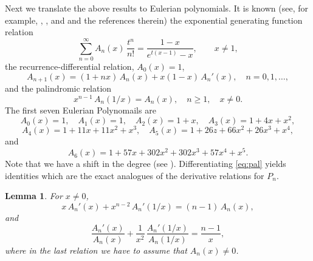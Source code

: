 \documentclass[11pt]{article}
\newtheorem{lemma}{Lemma}
\begin{document}
Next we translate the above results to Eulerian polynomials. It is known (see, for example, \cite[p. 51]{Com}, \cite{Foa}, \cite{Lus} and \cite{Qi} and the references therein) the exponential generating function relation
  \begin{equation}\label{eq:eulerianGF}
  \sum_{n=0}^{\infty} A_n(x)\,\frac{t^n}{n!} = \frac{1-x}{e^{t(x-1)}-x},\qquad x\ne 1,
  \end{equation}
the recurrence-differential relation, $A_0(x)=1$,
\[
  A_{n+1}(x) = (1+n x)\,A_n(x) + x(1-x)\,A_n'(x),\quad n=0,1,\ldots,
\]
and the palindromic relation
\begin{equation}\label{eq:pal}
 x^{n-1}\,A_n(1/x)=A_n(x),\quad n\ge 1, \quad x\ne 0.
\end{equation}
The first seven Eulerian Polynomails are
\[
A_0(x)=1,\quad A_1(x)=1,\quad A_2(x)=1+x,\quad A_3(x)=1 + 4 x+ x^2,
\]
\[
A_4(x)=1 + 11 x + 11 x^2 + x^3, \quad A_5(x)=1 + 26 z + 66 x^2 + 26 x^3 + x^4,
\]
and
\[
A_6(x)=1 + 57 x + 302 x^2 + 302 x^3 + 57 x^4 + x^5.
\]
Note that we have a shift in the degree (see \cite[pp. 485-486]{Eul}). Differentiating \eqref{eq:pal} yields identities which are the exact analogues of the derivative relations for $P_n$.
\begin{lemma}\label{lem:derivatives}
For $x\ne 0$,
\begin{equation}
 x\,A_n'(x) + x^{n-2}\,A_n'(1/x) = (n-1)\,A_n(x),\label{eq:der-one}
 \end{equation}
 and
 \begin{equation}
 \frac{A_n'(x)}{A_n(x)} + \frac{1}{x^2}\,\frac{A_n'(1/x)}{A_n(1/x)} = \frac{n-1}{x},\label{eq:der-two}
\end{equation}
where in the last relation we have to assume that $A_n(x)\ne 0$.
\end{lemma}
\end{document}
